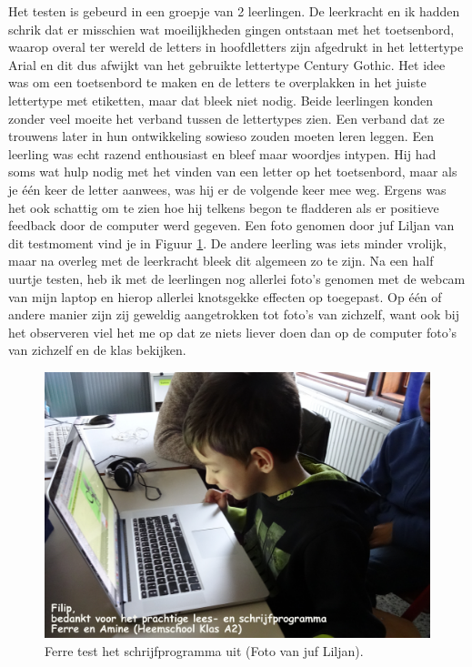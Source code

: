 \documentclass[a4paper,11pt]{article}
\theoremstyle{definition}
\begin{document}
 \noindent Het testen is gebeurd in een groepje van 2 leerlingen. 
 De leerkracht en ik hadden schrik dat er misschien wat moeilijkheden gingen ontstaan met het toetsenbord,
 waarop overal ter wereld de letters in hoofdletters zijn afgedrukt in het lettertype Arial en dit dus afwijkt van het gebruikte lettertype Century Gothic.
 Het idee was om een toetsenbord te maken en de letters te overplakken in het juiste lettertype met etiketten, maar dat bleek niet nodig. Beide leerlingen
 konden zonder veel moeite het verband tussen de lettertypes zien. Een verband dat ze trouwens later in hun ontwikkeling sowieso zouden moeten leren leggen.
    Een leerling 
 was echt razend enthousiast en bleef maar woordjes intypen. Hij had soms wat hulp nodig met het vinden van een letter op het toetsenbord, maar als je één keer de letter aanwees, was hij er de volgende keer mee weg. Ergens was het ook schattig om te zien hoe hij telkens begon te fladderen
 als er positieve feedback door de computer werd gegeven. Een foto genomen door juf Liljan van dit testmoment vind je in Figuur \ref{ferre}. De andere leerling 
 was iets minder vrolijk, maar na overleg met de leerkracht bleek dit algemeen zo te zijn. 
 Na een half uurtje testen, heb ik met de leerlingen nog allerlei foto's genomen 
 met de webcam van mijn laptop
 en hierop allerlei knotsgekke effecten op toegepast. Op één of andere manier 
 zijn zij geweldig aangetrokken tot foto's van zichzelf, want ook bij het 
 observeren viel het me op dat ze niets liever doen dan op de computer foto's van zichzelf en de 
 klas bekijken.

 \begin{figure}[h!]
  \centering
  \includegraphics[scale=0.075]{ferre.jpg}\caption{Ferre test het schrijfprogramma uit (Foto van juf Liljan).}\label{ferre}
\end{figure}
\end{document}
